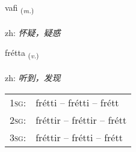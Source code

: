 \documentclass[frontgrid, backgrid]{flacards}\usepackage[]{graphicx}\usepackage[]{color}
\begin{document}
\renewcommand{\blhead}{\vskip5pt {\small\bfseries\footnotesize Nafnorð | 名词 }}
\renewcommand{\bcfoot}{\vskip5pt \hspace{2pt}{\small\bfseries\footnotesize 2K}}


{vafi \small{\textsubscript{(\textit{m.})}} \\[1ex] %
\textphonetic{[vaːvɪ]} \\
zh: \emph{怀疑，疑惑} \\  [2ex]
\renewcommand*{\arraystretch}{0.8}
}

\renewcommand{\flhead}{\vskip5pt \fboxsep=0pt {\small\bfseries\footnotesize Sagnorð | 动词}}
\renewcommand{\fcfoot}{\vskip5pt \fboxsep=0pt \hspace{2pt}{\small\bfseries\footnotesize 2K}}

\renewcommand{\blhead}{\vskip5pt {\small\bfseries\footnotesize Sagnorð | 动词 }}
\renewcommand{\bcfoot}{\vskip5pt \hspace{2pt}{\small\bfseries\footnotesize 2K}}


{frétta \small{\textsubscript{(\textit{v.})}} \\[1ex] %
\textphonetic{[frjɛhta]} \\
zh: \emph{听到，发现} \\  [2ex]
\renewcommand*{\arraystretch}{0.8}
\begin{tabular}{p{1cm}l}
\textsc{1sg}: & frétti -- frétti -- frétt \\ 
\textsc{2sg}: & fréttir -- fréttir -- frétt \\ 
\textsc{3sg}: & fréttir -- frétti -- frétt \\ 
\end{tabular}
}

\renewcommand{\flhead}{\vskip5pt \fboxsep=0pt {\small\bfseries\footnotesize Nafnorð | 名词}}
\renewcommand{\fcfoot}{\vskip5pt \fboxsep=0pt \hspace{2pt}{\small\bfseries\footnotesize 2K}}
\end{document}
